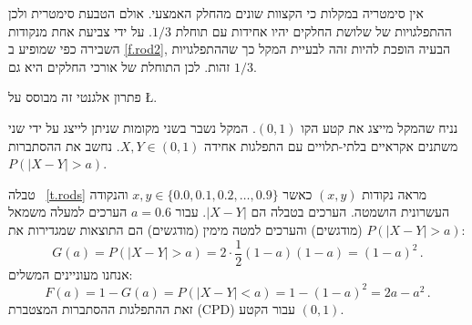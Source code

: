 
אין סימטריה במקלות כי הקצוות שונים מהחלק האמצעי. אולם הטבעת סימטרית ולכן ההתפלגויות של שלושת החלקים יהיו אחידות עם תוחלת
$1/3$.
על ידי צביעת אחת מנקודות השבירה כפי שמופיע ב%
\ref{f.rod2},
הבעיה הופכת להיות זהה לבעיית המקל כך שההתפלגויות זהות. לכן התוחלת של אורכי החלקים היא גם
$1/3$.


פתרון אלגנטי זה מבוסס על
\L{\cite{stack-rods}}.

נניח שהמקל מייצג את קטע הקו 
$(0,1)$.
המקל נשבר בשני מקומות שניתן לייצג על ידי שני משתנים אקראיים בלתי-תלויים עם התפלגות אחידה
$X,Y\in (0,1)$.
נחשב את ההסתברות
$P(|X-Y|>a)$.

טבלה%
~\ref{t.rods}
מראה נקודות 
$(x,y)$
כאשר
$x,y \in \{0.0, 0.1, 0.2, \ldots, 0.9\}$
והנקודה העשרונית הושמטה. הערכים בטבלה הם
$|X-Y|$.
עבור
$a=0.6$
הערכים למעלה משמאל (מודגשים) והערכים למטה מימין (מודגשים) הם התוצאות שמגדירות את
$P(|X-Y|>a)$:
\[
G(a)=P(|X-Y|>a)=2\cdot \frac{1}{2}(1-a)(1-a)=(1-a)^2\,.
\]
אנחנו מעוניינים המשלים:
\[
F(a)=1-G(a)=P(|X-Y|<a)=1-(1-a)^2=2a-a^2\,.
\]
זאת ההתפלגות ההסתברות המצטברת 
(CPD)
עבור הקטע
$(0,1)$. 

